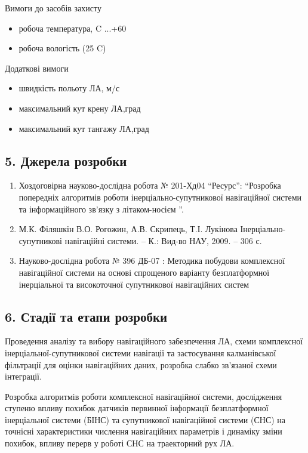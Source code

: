 \documentclass[ukrainian,utf8,simple,floatsingle,hpadding=5mm]{eskdtext}
\begin{document}
Вимоги до засобів захисту
\begin{itemize}
    \item робоча температура, C   ...+60
    \item робоча вологість (25 C)    
\end{itemize}

Додаткові вимоги
\begin{itemize}
    \item швидкість польоту ЛА, м/с  
    \item максимальний кут крену ЛА,град 
    \item максимальний кут тангажу ЛА,град 
\end{itemize}




\subsection*{5. Джерела розробки}

\begin{enumerate}
 \item Хоздоговірна науково-дослідна робота № 201-Хд04 “Ресурс”: “Розробка 
попередніх алгоритмів роботи інерціально-супутникової навігаційної 
системи та інформаційного зв'язку з літаком-носієм ”.
 \item М.К. Філяшкін В.О. Рогожин, А.В. Скрипець, Т.І. Лукінова 
Інерціально-супутникові навігаційні  системи. – К.: Вид-во НАУ, 2009. – 306 с.
 \item Науково-дослідна робота  № 396 ДБ-07 : Методика побудови 
комплексної навігаційної системи на основі спрощеного варіанту 
безплатформної інерціальної та високоточної супутникової навігаційних систем
\end{enumerate}
\subsection*{6. Стадії та етапи розробки}

Проведення аналізу та вибору навігаційного забезпечення ЛА, 
схеми комплексної інерціальної-супутникової системи навігації 
та застосування калманівської фільтрації для оцінки навігаційних 
даних, розробка слабко зв’язаної схеми інтеграції.

Розробка алгоритмів роботи комплексної навігаційної системи, 
дослідження ступеню впливу похибок датчиків первинної інформації  
безплатформної інерціальної системи (БІНС) та супутникової 
навігаційної системи (СНС) на точнісні характеристики числення 
навігаційних параметрів і динаміку зміни похибок, впливу перерв 
у роботі СНС на траекторний рух ЛА.
\end{document}
